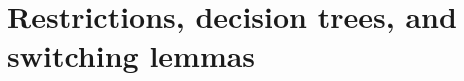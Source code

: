 \chapter{Restrictions, decision trees, and switching lemmas}
\label{chapter:switching-lemmas}









